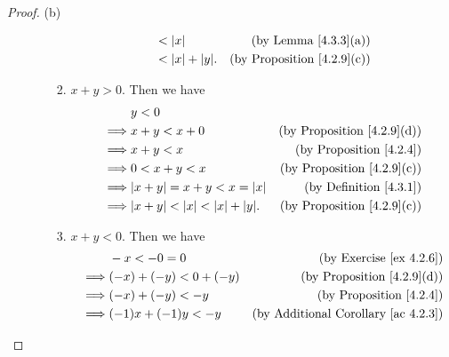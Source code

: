 \begin{proof}{(b)}
\begin{enumerate}[label=(\Roman*)]
\begin{enumerate}[label=(\roman*)]
\begin{enumerate}[label=(\arabic*)]
\begin{align*}
                                                   & < \abs*{x}             & \text{(by Lemma \ref{4.3.3}(a))}       \\
                                                   & < \abs*{x} + \abs*{y}. & \text{(by Proposition \ref{4.2.9}(c))}
                                  \end{align*}
                            \item \(x + y > 0\).
                                  Then we have
                                  \begin{align*}
                                               & y < 0                                                                                   \\
                                      \implies & x + y < x + 0                                  & \text{(by Proposition \ref{4.2.9}(d))} \\
                                      \implies & x + y < x                                      & \text{(by Proposition \ref{4.2.4})}    \\
                                      \implies & 0 < x + y < x                                  & \text{(by Proposition \ref{4.2.9}(c))} \\
                                      \implies & \abs*{x + y} = x + y < x = \abs*{x}            & \text{(by Definition \ref{4.3.1})}     \\
                                      \implies & \abs*{x + y} < \abs*{x} < \abs*{x} + \abs*{y}. & \text{(by Proposition \ref{4.2.9}(c))}
                                  \end{align*}
                            \item \(x + y < 0\).
                                  Then we have
                                  \begin{align*}
                                               & -x < -0 = 0                                    & \text{(by Exercise \ref{ex 4.2.6})}             \\
                                      \implies & (-x) + (-y) < 0 + (-y)                         & \text{(by Proposition \ref{4.2.9}(d))}          \\
                                      \implies & (-x) + (-y) < -y                               & \text{(by Proposition \ref{4.2.4})}             \\
                                      \implies & (-1)x + (-1)y < -y                             & \text{(by Additional Corollary \ref{ac 4.2.3})} \\

\end{align*}
\end{enumerate}
\end{enumerate}
\end{enumerate}
\end{proof}
